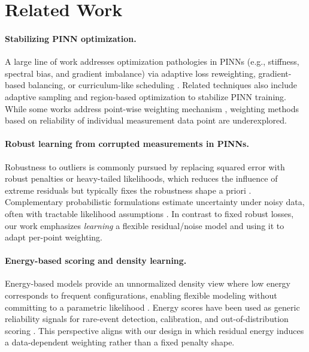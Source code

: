 \documentclass{article}
\theoremstyle{plain}
\theoremstyle{definition}
\theoremstyle{remark}
\begin{document}
\section{Related Work}
\label{sec:relatedwork}

\paragraph{Stabilizing PINN optimization.}
A large line of work addresses optimization pathologies in PINNs (e.g., stiffness, spectral bias, and gradient imbalance) via adaptive loss reweighting, gradient-based balancing, or curriculum-like scheduling \cite{Rahaman2019, Wang2021, SWang2022, CWang2022, Chen2018, Xiang2022, Hwang2024, Bischof2025}.  
Related techniques also include adaptive sampling \cite{Nabian2021} and region-based optimization \cite{Wu2024, duan2025} to stabilize PINN training. While some works address point-wise weighting mechanism \cite{McClenny2023}, weighting methods based on reliability of individual measurement data point are underexplored.

\paragraph{Robust learning from corrupted measurements in PINNs.}
Robustness to outliers is commonly pursued by replacing squared error with robust penalties or heavy-tailed likelihoods, which reduces the influence of extreme residuals but typically fixes the robustness shape a priori \cite{Huber1973, Yang2021, Peng2022, Duarte2025}.  
Complementary probabilistic formulations estimate uncertainty under noisy data, often with tractable likelihood assumptions \cite{Yang2019, Yang2021}.  
In contrast to fixed robust losses, our work emphasizes \emph{learning} a flexible residual/noise model and using it to adapt per-point weighting.

\paragraph{Energy-based scoring and density learning.}
Energy-based models provide an unnormalized density view where low energy corresponds to frequent configurations, enabling flexible modeling without committing to a parametric likelihood \cite{LeCun2006, Nijkamp2020, Du2019}.  
Energy scores have been used as generic reliability signals for rare-event detection, calibration, and out-of-distribution scoring \cite{Liu2020EnergyOOD, Hendrycks2016, Ovadia2019}.  
This perspective aligns with our design in which residual energy induces a data-dependent weighting rather than a fixed penalty shape.
\end{document}
